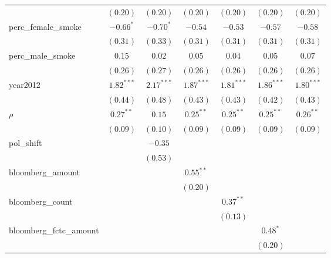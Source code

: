 \begin{table}[!h]
\begin{center}
\begin{tabular}{l c c c c c c }
                        & $(0.20)$     & $(0.20)$     & $(0.20)$     & $(0.20)$     & $(0.20)$     & $(0.20)$     \\
perc\_female\_smoke     & $-0.66^{*}$  & $-0.70^{*}$  & $-0.54$      & $-0.53$      & $-0.57$      & $-0.58$      \\
                        & $(0.31)$     & $(0.33)$     & $(0.31)$     & $(0.31)$     & $(0.31)$     & $(0.31)$     \\
perc\_male\_smoke       & $0.15$       & $0.02$       & $0.05$       & $0.04$       & $0.05$       & $0.07$       \\
                        & $(0.26)$     & $(0.27)$     & $(0.26)$     & $(0.26)$     & $(0.26)$     & $(0.26)$     \\
year2012                & $1.82^{***}$ & $2.17^{***}$ & $1.87^{***}$ & $1.81^{***}$ & $1.86^{***}$ & $1.80^{***}$ \\
                        & $(0.44)$     & $(0.48)$     & $(0.43)$     & $(0.43)$     & $(0.42)$     & $(0.43)$     \\
$\rho$                  & $0.27^{**}$  & $0.15$       & $0.25^{**}$  & $0.25^{**}$  & $0.25^{**}$  & $0.26^{**}$  \\
                        & $(0.09)$     & $(0.10)$     & $(0.09)$     & $(0.09)$     & $(0.09)$     & $(0.09)$     \\
pol\_shift              &              & $-0.35$      &              &              &              &              \\
                        &              & $(0.53)$     &              &              &              &              \\
bloomberg\_amount       &              &              & $0.55^{**}$  &              &              &              \\
                        &              &              & $(0.20)$     &              &              &              \\
bloomberg\_count        &              &              &              & $0.37^{**}$  &              &              \\
                        &              &              &              & $(0.13)$     &              &              \\
bloomberg\_fctc\_amount &              &              &              &              & $0.48^{*}$   &              \\
                        &              &              &              &              & $(0.20)$     &              \\

\end{tabular}
\end{center}
\end{table}
